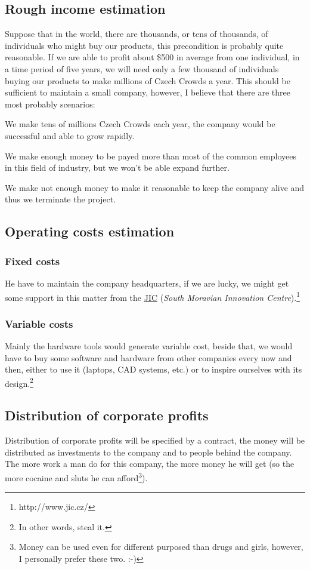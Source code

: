 \documentclass[a4paper,twoside,15pt]{book}
\begin{document}
		\subsection{Rough income estimation}
			Suppose that in the world, there are thousands, or tens of thousands, of individuals who might buy our products, this precondition is probably quite reasonable. If we are able to profit about \$500 in average from one individual, in a time period of five years, we will need only a few thousand of individuals buying our products to make millions of Czech Crowds a year. This should be sufficient to maintain a small company, however, I believe that there are three most probably scenarios:
			\begin{dinglist}{73}
				\item[\ding{246}] We make tens of millions Czech Crowds each year, the company would be successful and able to grow rapidly.
				\item[\ding{245}] We make enough money to be payed more than most of the common employees in this field of industry, but we won't be able expand further.
				\item[\ding{244}] We make not enough money to make it reasonable to keep the company alive and thus we terminate the project.
			 \end{dinglist}

		\subsection{Operating costs estimation}
			\subsubsection{Fixed costs}
				He have to maintain the company headquarters, if we are lucky, we might get some support in this matter from the \href{http://www.jic.cz/}{JIC} (\textit{South Moravian Innovation Centre}).\footnote{http://www.jic.cz/}
			\subsubsection{Variable costs}
				Mainly the hardware tools would generate variable cost, beside that, we would have to buy some software and hardware from other companies every now and then, either to use it (laptops, CAD systems, etc.) or to inspire ourselves with its design.\footnote{In other words, steal it.}

		\subsection{Distribution of corporate profits}
			Distribution of corporate profits will be specified by a contract, the money will be distributed as investments to the company and to people behind the company. The more work a man do for this company, the more money he will get (so the more cocaine and sluts he can afford\footnote{Money can be used even for different purposed than drugs and girls, however, I personally prefer these two. :-)}).
\end{document}
